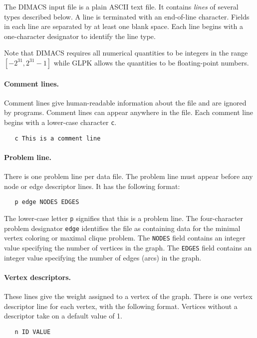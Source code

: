 \documentclass[dvipdfm,11pt]{report}
\begin{document}
The DIMACS input file is a plain ASCII text file. It contains
{\it lines} of several types described below. A line is terminated with
an end-of-line character. Fields in each line are separated by at least
one blank space. Each line begins with a one-character designator to
identify the line type.

Note that DIMACS requires all numerical quantities to be integers in
the range $[-2^{31},2^{31}-1]$ while GLPK allows the quantities to be
floating-point numbers.

\paragraph{Comment lines.} Comment lines give human-readable information
about the file and are ignored by programs. Comment lines can appear
anywhere in the file. Each comment line begins with a lower-case
character \verb|c|.

\begin{verbatim}
   c This is a comment line
\end{verbatim}

\paragraph{Problem line.} There is one problem line per data file. The
problem line must appear before any node or edge descriptor lines. It
has the following format:

\begin{verbatim}
   p edge NODES EDGES
\end{verbatim}

\noindent
The lower-case letter \verb|p| signifies that this is a problem line.
The four-character problem designator \verb|edge| identifies the file
as containing data for the minimal vertex coloring or maximal clique
problem. The \verb|NODES| field contains an integer value specifying
the number of vertices in the graph. The \verb|EDGES| field contains an
integer value specifying the number of edges (arcs) in the graph.

\paragraph{Vertex descriptors.} These lines give the weight assigned to
a vertex of the graph. There is one vertex descriptor line for each
vertex, with the following format. Vertices without a descriptor take on
a default value of 1.

\begin{verbatim}
   n ID VALUE
\end{verbatim}
\end{document}
